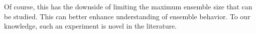 Of course, this has the downside of limiting the maximum ensemble size that can be studied. This can better enhance understanding of ensemble behavior. To our knowledge, such an experiment is novel in the literature. 
